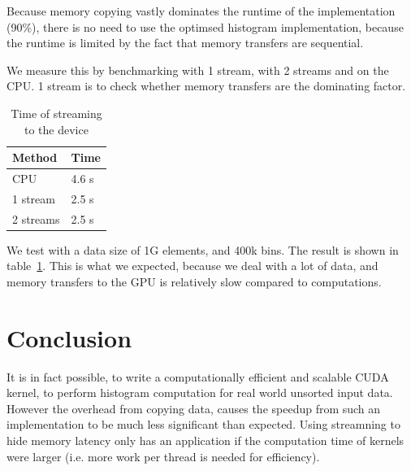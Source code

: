 \documentclass[12pt, a4paper, hidelinks]{article}
\begin{document}
Because memory copying vastly dominates the runtime of the implementation (90\%),
there is no need to use the optimsed histogram implementation, because the runtime
is limited by the fact that memory transfers are sequential.

We measure this by benchmarking with 1 stream, with 2 streams and on the CPU. 1 stream
is to check whether memory transfers are the dominating factor.

\begin{table}[htpb]
    \centering
    \begin{tabular}{l l}
        Method & Time \\
        \hline
        CPU & 4.6 s \\
        1 stream  & 2.5 s \\
        2 streams & 2.5 s \\
        \hline
    \end{tabular}
    \caption{Time of streaming to the device}
    \label{tab:stream}
\end{table}

We test with a data size of 1G elements, and 400k bins. The result is shown in table~\ref{tab:stream}.
This is what we expected, because we deal with a lot of data, and memory transfers to the GPU is
relatively slow compared to computations.

\section{Conclusion}
It is in fact possible, to write a computationally efficient and scalable CUDA kernel,
to perform histogram computation for real world unsorted input data.
However the overhead from copying data,
causes the speedup from such an implementation to be much less significant than expected. Using streamning to hide memory latency only has an application if the computation time of kernels were larger (i.e. more work per thread is needed for efficiency).


\end{document}
